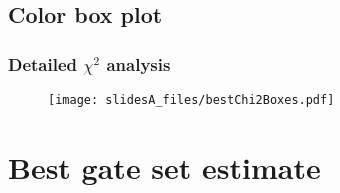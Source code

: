 \documentclass{beamer}
\begin{document}
{\subsection{Color box plot}
\begin{frame}
\frametitle{Detailed $\chi^2$ analysis}

\begin{figure}
\begin{center}
\texttt{[image: slidesA\_files/bestChi2Boxes.pdf]}
\end{center}
\end{figure}
\end{frame}

}{}

\section{Best gate set estimate}
\end{document}
